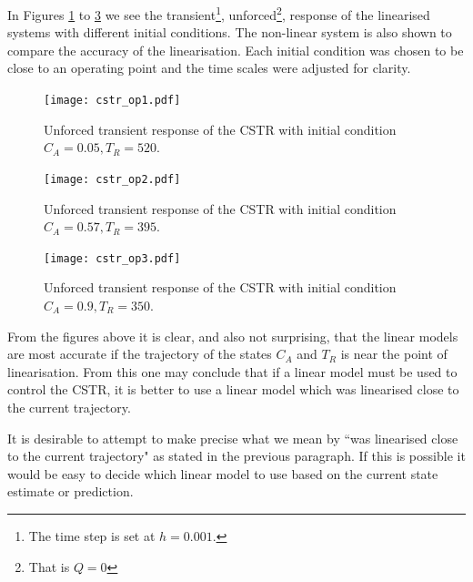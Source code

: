 \documentclass[../masters.tex]{subfiles}
\begin{document}
In Figures \ref{fig_cstr_op1} to \ref{fig_cstr_op3} we see the transient\footnote{The time step is set at $h=0.001$.}, unforced\footnote{That is $Q=0$}, response of the linearised systems with different initial conditions. The non-linear system is also shown to compare the accuracy of the linearisation. Each initial condition was chosen to be close to an operating point and the time scales were adjusted for clarity. 
\begin{figure}[H] 
\centering
\texttt{[image: cstr\_op1.pdf]}
\caption{Unforced transient response of the CSTR with initial condition $C_A = 0.05,T_R=520$.}
\label{fig_cstr_op1}
\end{figure}
\begin{figure}[H] 
\centering
\texttt{[image: cstr\_op2.pdf]}
\caption{Unforced transient response of the CSTR with initial condition $C_A = 0.57,T_R=395$.}
\label{fig_cstr_op2}
\end{figure}
\begin{figure}[H] 
\centering
\texttt{[image: cstr\_op3.pdf]}
\caption{Unforced transient response of the CSTR with initial condition $C_A = 0.9,T_R=350$.}
\label{fig_cstr_op3}
\end{figure}
From the figures above it is clear, and also not surprising, that the linear models are most accurate if the trajectory of the states $C_A$ and $T_R$ is near the point of linearisation. From this one may conclude that if a linear model must be used to control the CSTR, it is better to use a linear model which was linearised close to the current trajectory.

It is desirable to attempt to make precise what we mean by ``was linearised close to the current trajectory" as stated in the previous paragraph. If this is possible it would be easy to decide which linear model to use based on the current state estimate or prediction.
\end{document}
